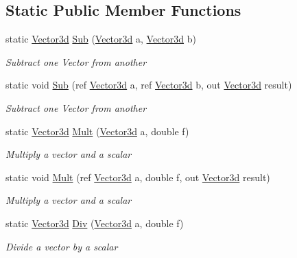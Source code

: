 \subsection*{Static Public Member Functions}
\begin{DoxyCompactItemize}
\item 
static \hyperlink{struct_open_t_k_1_1_vector3d}{Vector3d} \hyperlink{struct_open_t_k_1_1_vector3d_a78df40f0631ca6fd74944b1f8ac9e20b}{Sub} (\hyperlink{struct_open_t_k_1_1_vector3d}{Vector3d} a, \hyperlink{struct_open_t_k_1_1_vector3d}{Vector3d} b)
\begin{DoxyCompactList}\small\item\em Subtract one Vector from another \end{DoxyCompactList}\item 
static void \hyperlink{struct_open_t_k_1_1_vector3d_a5bf0f4a3b881cfe3a88a3b4e75a86aa4}{Sub} (ref \hyperlink{struct_open_t_k_1_1_vector3d}{Vector3d} a, ref \hyperlink{struct_open_t_k_1_1_vector3d}{Vector3d} b, out \hyperlink{struct_open_t_k_1_1_vector3d}{Vector3d} result)
\begin{DoxyCompactList}\small\item\em Subtract one Vector from another \end{DoxyCompactList}\item 
static \hyperlink{struct_open_t_k_1_1_vector3d}{Vector3d} \hyperlink{struct_open_t_k_1_1_vector3d_a816913e521c522fd0ac4fe8da8ee850c}{Mult} (\hyperlink{struct_open_t_k_1_1_vector3d}{Vector3d} a, double f)
\begin{DoxyCompactList}\small\item\em Multiply a vector and a scalar \end{DoxyCompactList}\item 
static void \hyperlink{struct_open_t_k_1_1_vector3d_a6b782a5823060ed26170944622c94cc9}{Mult} (ref \hyperlink{struct_open_t_k_1_1_vector3d}{Vector3d} a, double f, out \hyperlink{struct_open_t_k_1_1_vector3d}{Vector3d} result)
\begin{DoxyCompactList}\small\item\em Multiply a vector and a scalar \end{DoxyCompactList}\item 
static \hyperlink{struct_open_t_k_1_1_vector3d}{Vector3d} \hyperlink{struct_open_t_k_1_1_vector3d_a40572545a7c1dda9815ca4c41a12fe57}{Div} (\hyperlink{struct_open_t_k_1_1_vector3d}{Vector3d} a, double f)
\begin{DoxyCompactList}\small\item\em Divide a vector by a scalar \end{DoxyCompactList}\item 

\end{DoxyCompactItemize}
